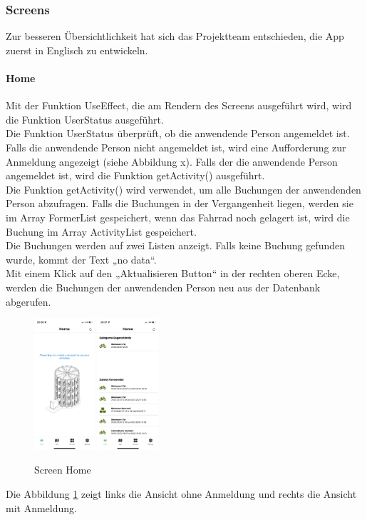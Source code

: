 \subsubsection{Screens}Zur besseren Übersichtlichkeit hat sich das Projektteam entschieden, die App zuerst in Englisch zu entwickeln.\\

\paragraph{Home}Mit der Funktion UseEffect, die am Rendern des Screens ausgeführt wird, wird die Funktion UserStatus ausgeführt.\\
Die Funktion UserStatus überprüft, ob die anwendende Person angemeldet ist. Falls die anwendende Person nicht angemeldet ist, wird eine Aufforderung zur Anmeldung angezeigt (siehe Abbildung x). Falls der die anwendende Person angemeldet ist, wird die Funktion getActivity() ausgeführt. \\
Die Funktion getActivity() wird verwendet, um alle Buchungen der anwendenden Person abzufragen. Falls die Buchungen in der Vergangenheit liegen, werden sie im Array FormerList gespeichert, wenn das Fahrrad noch gelagert ist, wird die Buchung im Array ActivityList gespeichert. \\
Die Buchungen werden auf zwei Listen anzeigt. Falls keine Buchung gefunden wurde, kommt der Text „no data“. \\
Mit einem Klick auf den „Aktualisieren Button“ in der rechten oberen Ecke, werden die Buchungen der anwendenden Person neu aus der Datenbank abgerufen.\\
\begin{figure}[H]
  \centering
  \includegraphics[width=0.2\textwidth]{images/app-screenshots/screenhomeno.png}
  \includegraphics[width=0.2\textwidth]{images/app-screenshots/screenhomeyes.png}
  \caption{Screen Home}
  \label{fig:screenhome}
\end{figure}
Die Abbildung \ref{fig:screenhome} zeigt links die Ansicht ohne Anmeldung und rechts die Ansicht mit Anmeldung.


